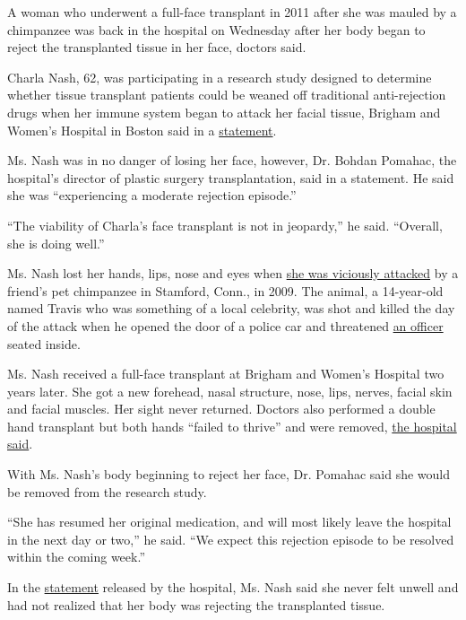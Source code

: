 A woman who underwent a full-face transplant in 2011 after she was
mauled by a chimpanzee was back in the hospital on Wednesday after her
body began to reject the transplanted tissue in her face, doctors said.

Charla Nash, 62, was participating in a research study designed to
determine whether tissue transplant patients could be weaned off
traditional anti-rejection drugs when her immune system began to attack
her facial tissue, Brigham and Women's Hospital in Boston said in a
\href{http://www.brighamandwomens.org/About_BWH/publicaffairs/news/facetransplant/facetransplantnash.aspx}{statement}.

Ms. Nash was in no danger of losing her face, however, Dr. Bohdan
Pomahac, the hospital's director of plastic surgery transplantation,
said in a statement. He said she was ``experiencing a moderate rejection
episode.''

``The viability of Charla's face transplant is not in jeopardy,'' he
said. ``Overall, she is doing well.''

Ms. Nash lost her hands, lips, nose and eyes when
\href{http://www.nytimes.com/2009/02/17/world/americas/17iht-chimp.1.20241928.html}{she
was viciously attacked} by a friend's pet chimpanzee in Stamford, Conn.,
in 2009. The animal, a 14-year-old named Travis who was something of a
local celebrity, was shot and killed the day of the attack when he
opened the door of a police car and threatened
\href{http://www.nytimes.com/2010/02/25/nyregion/25chimp.html}{an
officer} seated inside.

Ms. Nash received a full-face transplant at Brigham and Women's Hospital
two years later. She got a new forehead, nasal structure, nose, lips,
nerves, facial skin and facial muscles. Her sight never returned.
Doctors also performed a double hand transplant but both hands ``failed
to thrive'' and were removed,
\href{http://www.brighamandwomens.org/About_BWH/publicaffairs/news/facetransplant/FactSheet_June2011.pdf}{the
hospital said}.

With Ms. Nash's body beginning to reject her face, Dr. Pomahac said she
would be removed from the research study.

``She has resumed her original medication, and will most likely leave
the hospital in the next day or two,'' he said. ``We expect this
rejection episode to be resolved within the coming week.''

In the
\href{http://www.brighamandwomens.org/About_BWH/publicaffairs/news/facetransplant/facetransplantnash.aspx}{statement}
released by the hospital, Ms. Nash said she never felt unwell and had
not realized that her body was rejecting the transplanted tissue.

